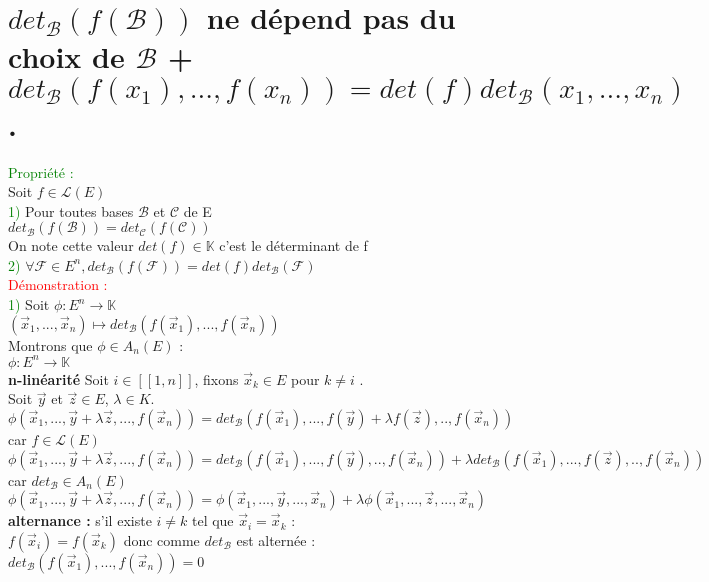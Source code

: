\documentclass{article}
\begin{document}
	\section{$det_{\mathcal B}(f(\mathcal B))$ ne dépend pas du choix de $\mathcal B$ + $det_{\mathcal B}(f(x_1),...,f(x_n))=det(f)det_{\mathcal B}(x_1,...,x_n) $.}
	\textcolor{green}{Propriété :}\\
	Soit $f \in \mathcal L(E)$ \\
\textcolor{green}{1)} Pour toutes bases $\mathcal B$ et $\mathcal C$ de E \\
$det_{\mathcal B}(f(\mathcal B))=det_{\mathcal C}(f(\mathcal C))$ \\
On note cette valeur $det(f) \in \mathbb K$ c'est le déterminant de f \\
\textcolor{green}{2)} $\forall \mathcal F \in E^n,det_{\mathcal B}(f(\mathcal F))=det(f)det_{\mathcal B}(\mathcal F)$ \\
\textcolor{red}{Démonstration :} \\
\textcolor{green}{1)} Soit $\phi : E^n \rightarrow \mathbb K$ \\
\indent $(\vec x_1,...,\vec x_n) \mapsto det_{\mathcal B}(f(\vec x_1),...,f(\vec x_n))$ \\
Montrons que $\phi \in A_n(E)$ : \\
$\phi : E^n \rightarrow \mathbb K$ \\
{\bf n-linéarité }Soit $i \in [[1,n]]$, fixons $\vec x_k \in E$ pour $k\neq i$ . \\
Soit $\vec y$ et $\vec z \in E$, $\lambda \in K$. \\
$\phi(\vec x_1,...,\vec y + \lambda \vec z,...,f(\vec x_n))=det_{\mathcal B}(f(\vec x_1),...,f(\vec y)+ \lambda f(\vec z),..,f(\vec x_n))$ car $f \in \mathcal L(E)$ \\
$\phi(\vec x_1,...,\vec y + \lambda \vec z,...,f(\vec x_n))=det_{\mathcal B}(f(\vec x_1),...,f(\vec y),..,f(\vec x_n))+\lambda det_{\mathcal B}(f(\vec x_1),..., f(\vec z),..,f(\vec x_n))$ car $det_{\mathcal B} \in A_n (E)$ \\
$\phi(\vec x_1,...,\vec y + \lambda \vec z,...,f(\vec x_n))=\phi(\vec x_1,...,\vec y,...,\vec x_n)+\lambda \phi(\vec x_1,..., \vec z,...,\vec x_n)$ \\
{\bf alternance :} s'il existe $i \neq k$ tel que $\vec x_i= \vec x_k$ : \\
$f(\vec x_i)=f(\vec x_k)$ donc comme $det_{\mathcal B}$ est alternée : \\
$det_{\mathcal B}(f(\vec x_1),...,f(\vec x_n))=0$ \\
\end{document}

